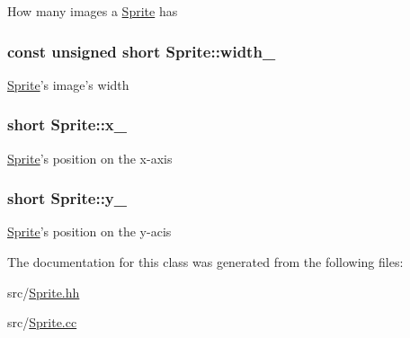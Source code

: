 How many images a \hyperlink{classSprite}{Sprite} has \hypertarget{classSprite_ac0c8b57b52d82f2753c1726e51ed0490}{
\subsubsection[{width\-\_\-}]{\setlength{\rightskip}{0pt plus 5cm}const unsigned short Sprite\-::width\-\_\-\hspace{0.3cm}{\ttfamily [protected]}}}\label{classSprite_ac0c8b57b52d82f2753c1726e51ed0490}
\hyperlink{classSprite}{Sprite}'s image's width \hypertarget{classSprite_ac66af2df2e5990c07252b8aa0d384346}{
\subsubsection[{x\-\_\-}]{\setlength{\rightskip}{0pt plus 5cm}short Sprite\-::x\-\_\-\hspace{0.3cm}{\ttfamily [protected]}}}\label{classSprite_ac66af2df2e5990c07252b8aa0d384346}
\hyperlink{classSprite}{Sprite}'s position on the x-\/axis \hypertarget{classSprite_a3ad6d07d083c5bbb2e819caa31d2bc6f}{
\subsubsection[{y\-\_\-}]{\setlength{\rightskip}{0pt plus 5cm}short Sprite\-::y\-\_\-\hspace{0.3cm}{\ttfamily [protected]}}}\label{classSprite_a3ad6d07d083c5bbb2e819caa31d2bc6f}
\hyperlink{classSprite}{Sprite}'s position on the y-\/acis 

The documentation for this class was generated from the following files\-:\begin{DoxyCompactItemize}
\item 
src/\hyperlink{Sprite_8hh}{Sprite.\-hh}\item 
src/\hyperlink{Sprite_8cc}{Sprite.\-cc}\end{DoxyCompactItemize}
